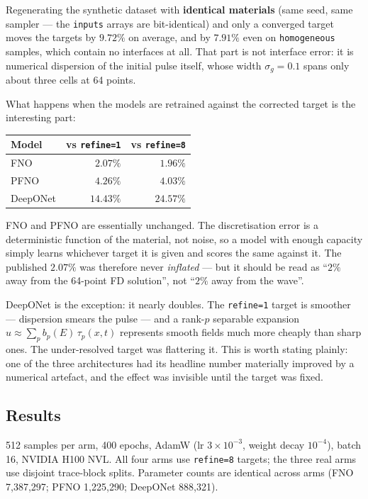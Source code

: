 \documentclass[11pt,a4paper]{article}
\begin{document}
Regenerating the synthetic dataset with \textbf{identical materials} (same seed,
same sampler --- the \texttt{inputs} arrays are bit-identical) and only a
converged target moves the targets by $\mathbf{9.72\%}$ on average, and by
$7.91\%$ even on \texttt{homogeneous} samples, which contain no interfaces at
all. That part is not interface error: it is numerical dispersion of the initial
pulse itself, whose width $\sigma_g=0.1$ spans only about three cells at 64
points.

What happens when the models are retrained against the corrected target is the
interesting part:

\begin{center}
\small
\begin{tabular}{lrr}
\toprule
\textbf{Model} & \textbf{vs \texttt{refine=1}} & \textbf{vs \texttt{refine=8}}\\
\midrule
FNO      & $2.07\%$  & $\mathbf{1.96\%}$\\
PFNO     & $4.26\%$  & $\mathbf{4.03\%}$\\
DeepONet & $14.43\%$ & $\mathbf{24.57\%}$\\
\bottomrule
\end{tabular}
\end{center}

FNO and PFNO are essentially unchanged. The discretisation error is a
deterministic function of the material, not noise, so a model with enough
capacity simply learns whichever target it is given and scores the same against
it. The published $2.07\%$ was therefore never \emph{inflated} --- but it should
be read as ``$2\%$ away from the 64-point FD solution'', not ``$2\%$ away from
the wave''.

DeepONet is the exception: it nearly doubles. The \texttt{refine=1} target is
smoother --- dispersion smears the pulse --- and a rank-$p$ separable expansion
$u\approx\sum_p b_p(E)\,\tau_p(x,t)$ represents smooth fields much more cheaply
than sharp ones. The under-resolved target was flattering it. This is worth
stating plainly: one of the three architectures had its headline number
materially improved by a numerical artefact, and the effect was invisible until
the target was fixed.

\subsection{Results}

512 samples per arm, 400 epochs, AdamW (lr $3\times10^{-3}$, weight decay
$10^{-4}$), batch 16, NVIDIA H100 NVL. All four arms use \texttt{refine=8}
targets; the three real arms use disjoint trace-block splits. Parameter counts
are identical across arms (FNO 7{,}387{,}297; PFNO 1{,}225{,}290; DeepONet
888{,}321).
\end{document}
